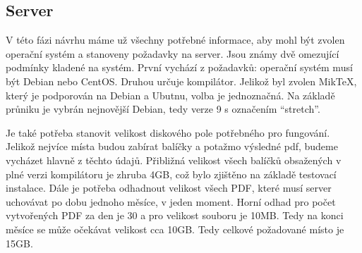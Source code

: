 \subsection{Server}
V této fázi návrhu máme už všechny potřebné informace, aby mohl být zvolen operační systém a stanoveny požadavky na server. Jsou známy dvě omezující podmínky kladené na systém. První vychází z požadavků: operační systém musí být Debian nebo CentOS. Druhou určuje kompilátor. Jelikož byl zvolen MikTeX, který je podporován na Debian a Ubutnu, volba je jednoznačná. Na základě průniku je vybrán nejnovější Debian, tedy verze 9 s označením \enquote{stretch}. 
\par
Je také potřeba stanovit velikost diskového pole potřebného pro fungování. Jelikož nejvíce místa budou zabírat balíčky a potažmo výsledné pdf, budeme vycházet hlavně z těchto údajů. Přibližná velikost všech balíčků obsažených v plné verzi kompilátoru je zhruba 4GB, což bylo zjištěno na základě testovací instalace. Dále je potřeba odhadnout velikost všech PDF, které musí server uchovávat po dobu jednoho měsíce, v jeden moment. Horní odhad pro počet vytvořených PDF za den je 30 a pro velikost souboru je 10MB. Tedy na konci měsíce se může očekávat velikost cca 10GB. Tedy celkové požadované místo je 15GB.  
 



